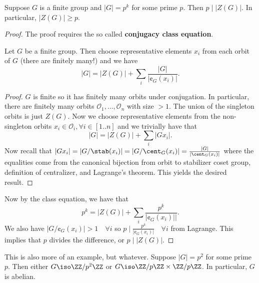 \begin{prop}
Suppose $G$ is a finite group and $\lvert G \rvert = p^k$ for some prime
$p$. Then $p \mid \lvert Z(G) \rvert$. In particular, $\lvert Z(G)
\rvert \geq p$.
\end{prop}

\begin{proof}
The proof requires the so called \textbf{conjugacy class equation}.
\begin{lem}
Let $G$ be a finite group. Then choose representative elements $x_i$
from each orbit of $G$ (there are finitely many!) and we have
\[ \lvert G \rvert = \lvert Z(G) \rvert + \sum_{i} \frac{\lvert G
\rvert}{\lvert \cent_G(x_i) \rvert}. \]
\end{lem}
\begin{proof}
$G$ is finite so it has finitely many orbits under conjugation. In
particular, there are finitely many orbits $\mathcal{O}_1, \dots,
\mathcal{O}_n$ with size $> 1$. The union of the singleton orbits is
just $Z(G)$. Now we choose representative elements from the
non-singleton orbits $x_i \in \mathcal{O}_i, \forall i \in [1..n]$ and
we trivially have that
\[ \lvert G \rvert = \lvert Z(G) \rvert + \sum_i \lvert Gx_i \rvert. \]
Now recall that $\lvert Gx_i \rvert = \lvert G / \stab(x_i) \rvert =
\lvert G / \cent_G(x_i) \rvert = \frac{\lvert G \rvert}{\lvert
\cent_G(x_i) \rvert}$ where the equalities come from the canonical
bijection from orbit to stabilizer coset group, definition of
centralizer, and Lagrange's theorem. This yields the desired result.
\end{proof}

Now by the class equation, we have that
\[ p^k = \lvert Z(G) \rvert + \sum_i \frac{p^k}{\lvert \cent_G(x_i)
\rvert|}. \]
We also have $\lvert G / \cent_G(x_i) \rvert > 1 \quad \forall i$ so $p
\mid \frac{p^k}{\lvert \cent_G(x_i) \rvert} \quad \forall i$ from
Lagrange. This implies that $p$ divides the difference, or $p \mid
\lvert Z(G) \rvert$.
\end{proof}

\begin{prop}
This is also more of an example, but whatever. Suppose $\lvert G \rvert
= p^2$ for some prime $p$. Then either $G \iso \ZZ / p^2 \ZZ$ or $G \iso
\ZZ / p \ZZ \times \ZZ / p \ZZ$. In particular, $G$ is abelian.
\end{prop}

